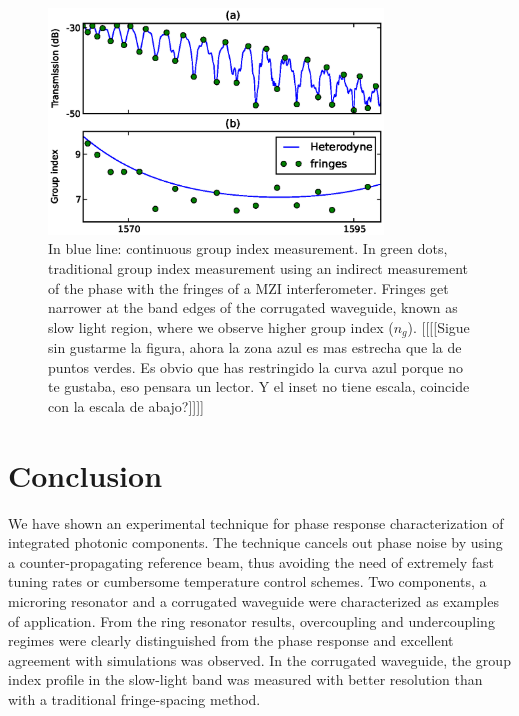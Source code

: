 \documentclass[journal]{IEEEtran}
\begin{document}

% 


\begin{figure}[htb]
  \centering
  \includegraphics[width=3.5in]{gropIndexComparison_2}
  \caption{In blue line: continuous group index measurement. In green dots, traditional group index measurement using an indirect measurement of the phase with the fringes of a MZI interferometer. Fringes get narrower at the band edges of the corrugated waveguide, known as slow light region, where we observe higher group index ($n_g$). [[[[Sigue sin gustarme la figura, ahora la zona azul es mas estrecha que la de puntos verdes. Es obvio que has restringido la curva azul porque no te gustaba, eso pensara un lector. Y el inset no tiene escala, coincide con la escala de abajo?]]]]} 
  \label{fig:groupIndex}
\end{figure}



\section{Conclusion}
We have shown an experimental technique for phase response characterization of integrated photonic components. The technique cancels out phase noise by using a counter-propagating reference beam, thus avoiding the need of extremely fast tuning rates or cumbersome temperature control schemes. Two components, a microring resonator and a corrugated waveguide were characterized as examples of application. From the ring resonator results, overcoupling and undercoupling regimes were clearly distinguished from the phase response and excellent agreement with simulations was observed. In the corrugated waveguide, the group index profile in the slow-light band was measured with better resolution than with a traditional fringe-spacing method.
\end{document}
